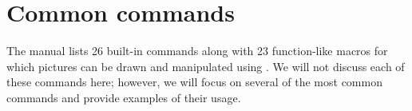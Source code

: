 \section{Common commands}
\label{sec:commoncmds}

The \MP{} manual \cite{hobby:user} lists 26 built-in commands along with
23 function-like macros for which pictures can be drawn and manipulated
using \MP.  We will not discuss each of these commands here; however, we
will focus on several of the most common commands and provide examples
of their usage.





